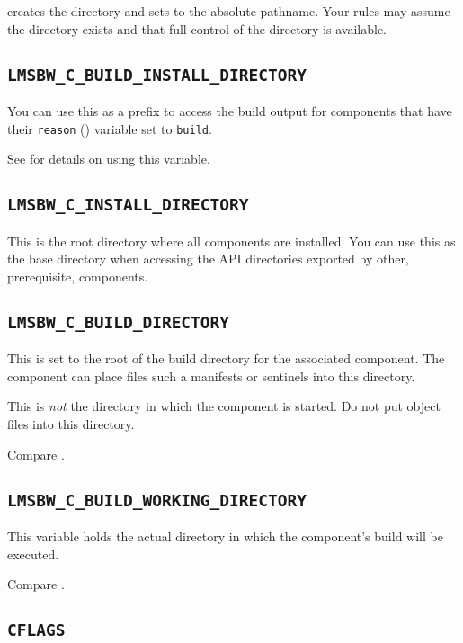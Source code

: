 \lmsbw creates the directory and sets \destdir to the absolute
pathname.  Your rules may assume the directory exists and that full
control of the directory is available.


\subsection{\texttt{LMSBW\_C\_BUILD\_INSTALL\_DIRECTORY}}\label{wrap:build-install-directory}

You can use this as a prefix to access the build output for components
that have their \texttt{reason} () variable set
to \texttt{build}.

See  for details on using this variable.

\subsection{\texttt{LMSBW\_C\_INSTALL\_DIRECTORY}}

This is the root directory where all components are installed.  You
can use this as the base directory when accessing the API directories
exported by other, prerequisite, components.

\subsection{\texttt{LMSBW\_C\_BUILD\_DIRECTORY}}\label{wrap:lmsbw-c-build-directory}

This is set to the root of the build directory for the associated
component.  The component \makefile can place files such a \mtree
manifests or \make sentinels into this directory.

This is \emph{not} the directory in which the component \makefile is
started.   Do not put object files into this directory.

Compare .

\subsection{\texttt{LMSBW\_C\_BUILD\_WORKING\_DIRECTORY}}\label{wrap:lmsbw-c-build-working-directory}

This variable holds the actual directory in which the component's
build will be executed.

Compare .

\subsection{\texttt{CFLAGS}}

